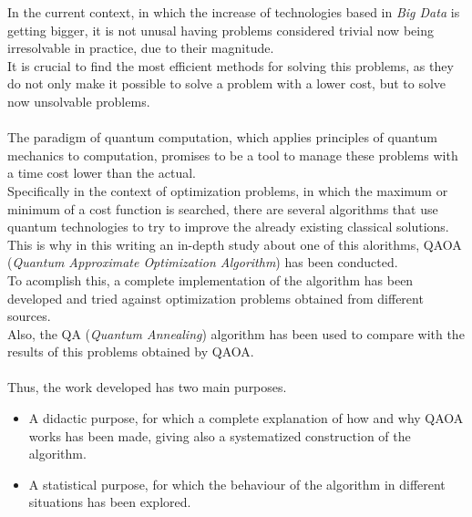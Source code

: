 In the current context, in which the increase of technologies based in \textit{Big Data} is getting bigger, it is not unusal having problems considered trivial now being irresolvable in practice, due to their magnitude.
\\
It is crucial to find the most efficient methods for solving this problems, as they do not only make it possible to solve a problem with a lower cost, but to solve now unsolvable problems.
\\\\
The paradigm of quantum computation, which applies principles of quantum mechanics to computation, promises to be a tool to manage these problems with a time cost lower than the actual.
\\
Specifically in the context of optimization problems, in which the maximum or minimum of a cost function is searched, there are several algorithms that use quantum technologies to try to improve the already existing classical solutions.
\\
This is why in this writing an in-depth study about one of this alorithms, QAOA (\textit{Quantum Approximate Optimization Algorithm}) has been conducted.
\\
To acomplish this, a complete implementation of the algorithm has been developed and tried against optimization problems obtained from different sources.
\\
Also, the QA (\textit{Quantum Annealing}) algorithm has been used to compare with the results of this problems obtained by QAOA\@.
\\\\
Thus, the work developed has two main purposes.
\begin{itemize}
\item A didactic purpose, for which a complete explanation of how and why QAOA works has been made, giving also a systematized construction of the algorithm.
  
\item A statistical purpose, for which the behaviour of the algorithm in different situations has been explored.
\end{itemize}


